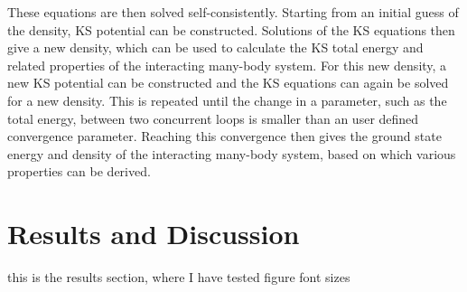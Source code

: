 \documentclass[12pt,a4paper,twoside]{article}
\numberwithin{equation}{section}
\renewcommand{\_}{\textscale{.7}{\textunderscore}}
\begin{document}
These equations are then solved self-consistently. Starting from an initial guess of the density, KS potential can be constructed. Solutions of the KS equations then give a new density, which can be used to calculate the KS total energy and related properties of the interacting many-body system. For this new density, a new KS potential can be constructed and the KS equations can again be solved for a new density. This is repeated until the change in a parameter, such as the total energy, between two concurrent loops is smaller than an user defined convergence parameter. Reaching this convergence then gives the ground state energy and density of the interacting many-body system, based on which various properties can be derived.

\section{Results and Discussion}
this is the results section, where I have tested figure font sizes
\end{document}
